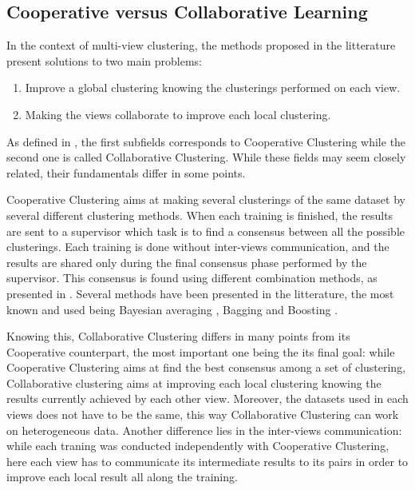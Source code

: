 \documentclass[a4paper]{report}
\begin{document}
    \subsection{Cooperative versus Collaborative Learning}
    In the context of multi-view clustering, the methods proposed in the litterature present solutions to two main problems:

    \begin{enumerate}
        \item Improve a global clustering knowing the clusterings performed on each view.
        \item Making the views collaborate to improve each local clustering.
    \end{enumerate}

    As defined in \cite{cornuejols2018collaborative}, the first subfields corresponds to Cooperative Clustering while the second one is called Collaborative Clustering. While these fields may seem closely related, their fundamentals differ in some points.

    Cooperative Clustering aims at making several clusterings of the same dataset by several different clustering methods. When each training is finished, the results are sent to a supervisor which task is to find a consensus between all the possible clusterings. Each training is done without inter-views communication, and the results are shared only during the final consensus phase performed by the supervisor. This consensus is found using different combination methods, as presented in \cite{kittler1998combining,dietterich2000ensemble}. Several methods have been presented in the litterature, the most known and used being Bayesian averaging \cite{kittler1998combining}, Bagging \cite{breiman1996bagging} and Boosting \cite{freund1997decision}.

    Knowing this, Collaborative Clustering differs in many points from its Cooperative counterpart, the most important one being the its final goal: while Cooperative Clustering aims at find the best consensus among a set of clustering, Collaborative clustering aims at improving each local clustering knowing the results currently achieved by each other view. Moreover, the datasets used in each views does not have to be the same, this way Collaborative Clustering can work on heterogeneous data. Another difference lies in the inter-views communication: while each traning was conducted independently with Cooperative Clustering, here each view has to communicate its intermediate results to its pairs in order to improve each local result all along the training.
    
\end{document}

